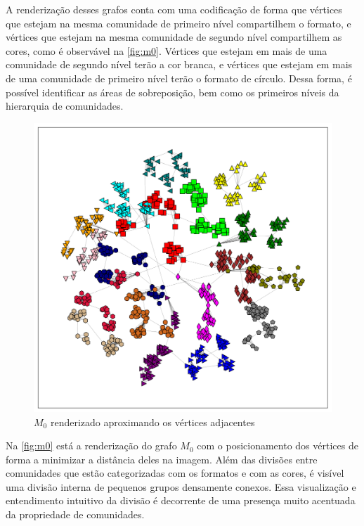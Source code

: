 \documentclass[notes.tex]{subfiles}
\begin{document}
A renderização desses grafos conta com uma codificação de forma que vértices que estejam na mesma comunidade de primeiro nível compartilhem o formato, e vértices que estejam na mesma comunidade de segundo nível compartilhem as cores, como é observável na \autoref{fig:m0}.
Vértices que estejam em mais de uma comunidade de segundo nível terão a cor branca, e vértices que estejam em mais de uma comunidade de primeiro nível terão o formato de círculo.
Dessa forma, é possível identificar as áreas de sobreposição, bem como os primeiros níveis da hierarquia de comunidades.

\begin{figure}[htpb]
    \centering
    \caption{$M_0$ renderizado aproximando os vértices adjacentes}\label{fig:m0}
    \includegraphics[width=\textwidth, height=0.6\textheight]{figures/m0.png}
\end{figure}

Na \autoref{fig:m0} está a renderização do grafo $M_0$ com o posicionamento dos vértices de forma a minimizar a distância deles na imagem.
Além das divisões entre comunidades que estão categorizadas com os formatos e com as cores, é visível uma divisão interna de pequenos grupos densamente conexos.
Essa visualização e entendimento intuitivo da divisão é decorrente de uma presença muito acentuada da propriedade de comunidades.
\end{document}
